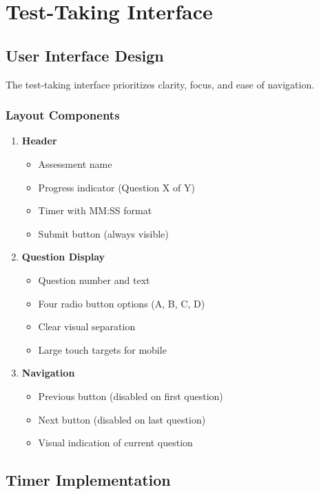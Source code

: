 \documentclass[12pt,a4paper]{report}
\begin{document}
\chapter{Test-Taking Interface}

\section{User Interface Design}

The test-taking interface prioritizes clarity, focus, and ease of navigation.

\subsection{Layout Components}

\begin{enumerate}
    \item \textbf{Header}
    \begin{itemize}
        \item Assessment name
        \item Progress indicator (Question X of Y)
        \item Timer with MM:SS format
        \item Submit button (always visible)
    \end{itemize}
    
    \item \textbf{Question Display}
    \begin{itemize}
        \item Question number and text
        \item Four radio button options (A, B, C, D)
        \item Clear visual separation
        \item Large touch targets for mobile
    \end{itemize}
    
    \item \textbf{Navigation}
    \begin{itemize}
        \item Previous button (disabled on first question)
        \item Next button (disabled on last question)
        \item Visual indication of current question
    \end{itemize}
\end{enumerate}

\section{Timer Implementation}
\end{document}
